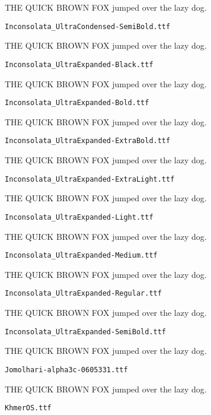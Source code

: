 \documentclass{article}
\begin{document}
THE QUICK BROWN FOX jumped over the lazy dog.

\setmainfont[Extension=.ttf]{Inconsolata_UltraCondensed-SemiBold}
\noindent \verb!Inconsolata_UltraCondensed-SemiBold.ttf!

THE QUICK BROWN FOX jumped over the lazy dog.

\setmainfont[Extension=.ttf]{Inconsolata_UltraExpanded-Black}
\noindent \verb!Inconsolata_UltraExpanded-Black.ttf!

THE QUICK BROWN FOX jumped over the lazy dog.

\setmainfont[Extension=.ttf]{Inconsolata_UltraExpanded-Bold}
\noindent \verb!Inconsolata_UltraExpanded-Bold.ttf!

THE QUICK BROWN FOX jumped over the lazy dog.

\setmainfont[Extension=.ttf]{Inconsolata_UltraExpanded-ExtraBold}
\noindent \verb!Inconsolata_UltraExpanded-ExtraBold.ttf!

THE QUICK BROWN FOX jumped over the lazy dog.

\setmainfont[Extension=.ttf]{Inconsolata_UltraExpanded-ExtraLight}
\noindent \verb!Inconsolata_UltraExpanded-ExtraLight.ttf!

THE QUICK BROWN FOX jumped over the lazy dog.

\setmainfont[Extension=.ttf]{Inconsolata_UltraExpanded-Light}
\noindent \verb!Inconsolata_UltraExpanded-Light.ttf!

THE QUICK BROWN FOX jumped over the lazy dog.

\setmainfont[Extension=.ttf]{Inconsolata_UltraExpanded-Medium}
\noindent \verb!Inconsolata_UltraExpanded-Medium.ttf!

THE QUICK BROWN FOX jumped over the lazy dog.

\setmainfont[Extension=.ttf]{Inconsolata_UltraExpanded-Regular}
\noindent \verb!Inconsolata_UltraExpanded-Regular.ttf!

THE QUICK BROWN FOX jumped over the lazy dog.

\setmainfont[Extension=.ttf]{Inconsolata_UltraExpanded-SemiBold}
\noindent \verb!Inconsolata_UltraExpanded-SemiBold.ttf!

THE QUICK BROWN FOX jumped over the lazy dog.

\setmainfont[Extension=.ttf]{Jomolhari-alpha3c-0605331}
\noindent \verb!Jomolhari-alpha3c-0605331.ttf!

THE QUICK BROWN FOX jumped over the lazy dog.

\setmainfont[Extension=.ttf]{KhmerOS}
\noindent \verb!KhmerOS.ttf!
\end{document}
